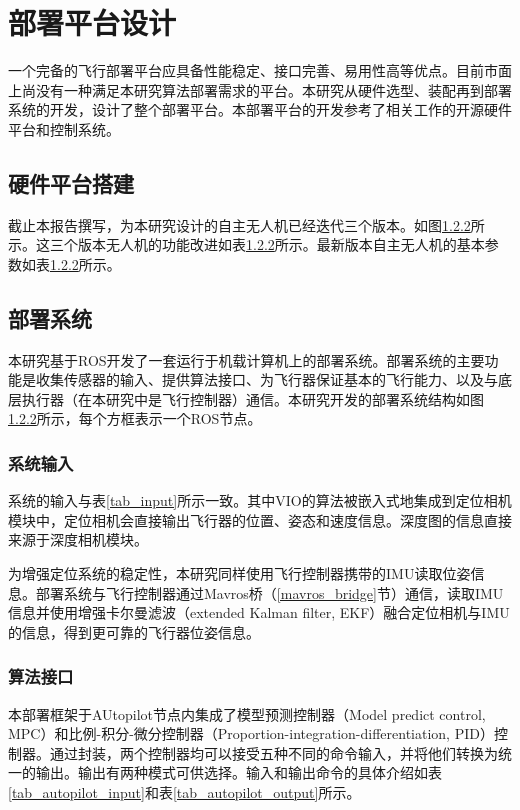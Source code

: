 
\chapter{部署平台设计}
一个完备的飞行部署平台应具备性能稳定、接口完善、易用性高等优点。目前市面上尚没有一种满足本研究算法部署需求的平台。本研究从硬件选型、装配再到部署系统的开发，设计了整个部署平台。本部署平台的开发参考了相关工作的开源硬件平台\cite{zhou2020ego}和控制系统\cite{Faessler18ral}。

\section{硬件平台搭建}

截止本报告撰写，为本研究设计的自主无人机已经迭代三个版本。如图\ref{}所示。这三个版本无人机的功能改进如表\ref{}所示。最新版本自主无人机的基本参数如表\ref{}所示。

\section{部署系统}
本研究基于ROS开发了一套运行于机载计算机上的部署系统。部署系统的主要功能是收集传感器的输入、提供算法接口、为飞行器保证基本的飞行能力、以及与底层执行器（在本研究中是飞行控制器）通信。本研究开发的部署系统结构如图\ref{}所示，每个方框表示一个ROS节点。

\subsection{系统输入}
系统的输入与表\ref{tab_input}所示一致。其中VIO的算法被嵌入式地集成到定位相机模块中，定位相机会直接输出飞行器的位置、姿态和速度信息。深度图的信息直接来源于深度相机模块。

为增强定位系统的稳定性，本研究同样使用飞行控制器携带的IMU读取位姿信息。部署系统与飞行控制器通过Mavros桥（\ref{mavros_bridge}节）通信，读取IMU信息并使用增强卡尔曼滤波\cite{kalman1960contributions}\cite{kalman1960new}\cite{kalman1961new}（extended Kalman filter, EKF）融合定位相机与IMU的信息，得到更可靠的飞行器位姿信息。

\subsection{算法接口}
本部署框架于AUtopilot节点内集成了模型预测控制器\cite{Falanga2018}（Model predict control, MPC）和比例-积分-微分控制器（Proportion-integration-differentiation, PID）控制器。通过封装，两个控制器均可以接受五种不同的命令输入，并将他们转换为统一的输出。输出有两种模式可供选择。输入和输出命令的具体介绍如表\ref{tab_autopilot_input}和表\ref{tab_autopilot_output}所示。


